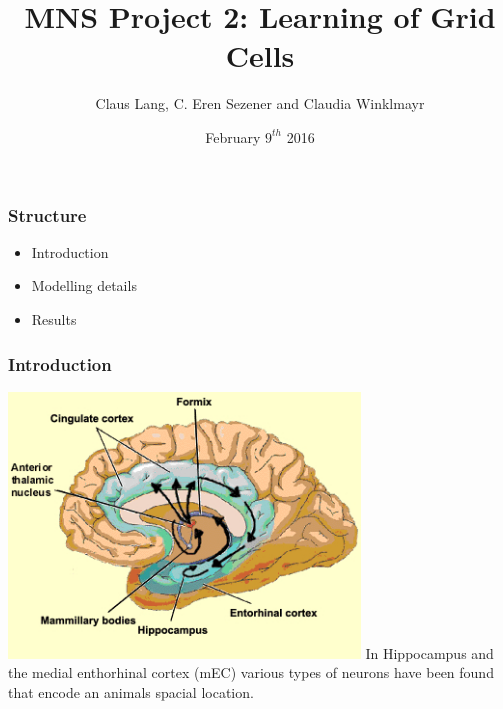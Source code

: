 \documentclass[mathserif]{beamer}
\title[MNS Project 2]{MNS Project 2: Learning of Grid Cells}
\author[C. Lang, C. E. Sezener, C.Winklmayr]{Claus Lang, C. Eren Sezener and Claudia Winklmayr}
\institute{BCCN}
\date[9.2.2016]{February $9^{th}$ 2016}
\begin{document}
\maketitle
%
%
%
\begin{frame}
\frametitle{Structure}
	\begin{itemize}
	\item Introduction\newline
	\item Modelling details\newline
	\item Results
	\end{itemize}
\end{frame}
%
%
%
\begin{frame}
\frametitle{Introduction}
\includegraphics[width=0.7\textwidth]{mEC.jpg}\newline
In Hippocampus and the medial enthorhinal cortex (mEC) various types of neurons have been found that encode an animals spacial location.  
\end{frame}
% 
%
%
\end{document}
